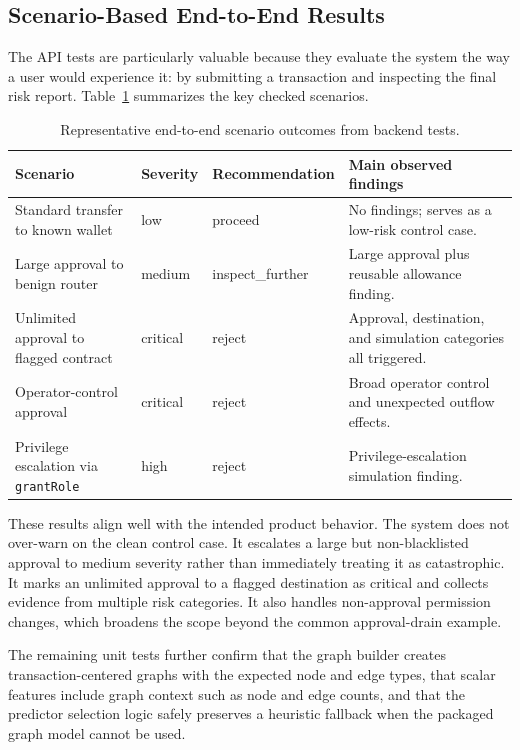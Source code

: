 \documentclass[11pt]{article}
\begin{document}
\subsection{Scenario-Based End-to-End Results}

The API tests are particularly valuable because they evaluate the system the way a user would experience it: by submitting a transaction and inspecting the final risk report. Table~\ref{tab:scenarioresults} summarizes the key checked scenarios.

\begin{table}[H]
\centering
\caption{Representative end-to-end scenario outcomes from backend tests.}
\label{tab:scenarioresults}
\begin{tabular}{p{4cm} p{2cm} p{2.4cm} p{6cm}}
\toprule
Scenario & Severity & Recommendation & Main observed findings \\
\midrule
Standard transfer to known wallet & low & proceed & No findings; serves as a low-risk control case. \\
Large approval to benign router & medium & inspect\_further & Large approval plus reusable allowance finding. \\
Unlimited approval to flagged contract & critical & reject & Approval, destination, and simulation categories all triggered. \\
Operator-control approval & critical & reject & Broad operator control and unexpected outflow effects. \\
Privilege escalation via \texttt{grantRole} & high & reject & Privilege-escalation simulation finding. \\
\bottomrule
\end{tabular}
\end{table}

These results align well with the intended product behavior. The system does not over-warn on the clean control case. It escalates a large but non-blacklisted approval to medium severity rather than immediately treating it as catastrophic. It marks an unlimited approval to a flagged destination as critical and collects evidence from multiple risk categories. It also handles non-approval permission changes, which broadens the scope beyond the common approval-drain example.

The remaining unit tests further confirm that the graph builder creates transaction-centered graphs with the expected node and edge types, that scalar features include graph context such as node and edge counts, and that the predictor selection logic safely preserves a heuristic fallback when the packaged graph model cannot be used.
\end{document}

